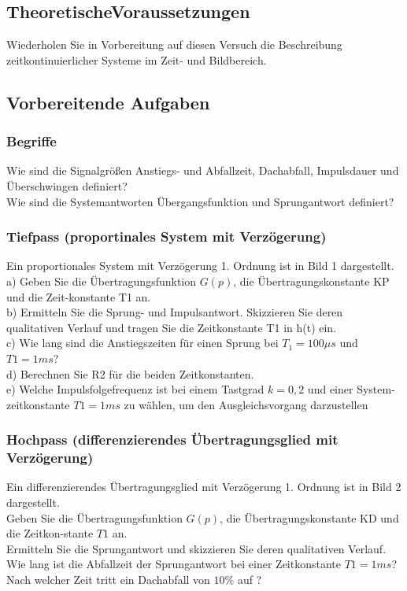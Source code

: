 \subsection{TheoretischeVoraussetzungen}

Wiederholen Sie in Vorbereitung auf diesen Versuch die Beschreibung 
zeitkontinuierlicher Systeme im Zeit- und Bildbereich.
\newline

\subsection{Vorbereitende Aufgaben}
\subsubsection{Begriffe}
Wie sind die Signalgrößen Anstiegs- und Abfallzeit, Dachabfall, Impulsdauer und Überschwingen definiert?\\
Wie sind die Systemantworten Übergangsfunktion und Sprungantwort definiert?\\
\subsubsection{Tiefpass (proportinales System mit Verzögerung)}
Ein proportionales System mit Verzögerung 1. Ordnung ist in Bild 1 dargestellt.\\
a)    Geben  Sie  die  Übertragungsfunktion  $G(p)$,  die  Übertragungskonstante  KP und die Zeit-konstante T1 an.\\ 
b)    Ermitteln  Sie  die  Sprung-  und  Impulsantwort. Skizzieren  Sie  deren  qualitativen  Verlauf und tragen Sie die Zeitkonstante T1 in h(t) ein.\\ 
c)    Wie lang sind die Anstiegszeiten für einen Sprung bei $T_{ 1 }=100\mu s$ und $T1 = 1 ms$?\\ 
d)    Berechnen Sie R2 für die beiden Zeitkonstanten.\\ 
e)    Welche Impulsfolgefrequenz ist bei einem Tastgrad $k = 0,2$ und einer System-zeitkonstante $T1 = 1 ms$ zu wählen, um den Ausgleichsvorgang darzustellen\\
\subsubsection{Hochpass (differenzierendes Übertragungsglied mit Verzögerung)}
Ein differenzierendes Übertragungsglied mit Verzögerung 1. Ordnung ist in Bild 2 dargestellt.\\
Geben  Sie  die  Übertragungsfunktion $G(p)$,  die  Übertragungskonstante  KD und die Zeitkon-stante $T1$ an.\\ 
Ermitteln Sie die Sprungantwort und skizzieren Sie deren qualitativen Verlauf.\\ 
Wie lang ist die Abfallzeit der Sprungantwort bei einer Zeitkonstante $T1 = 1 ms$?\\ 
Nach welcher Zeit tritt ein Dachabfall von $10\%$ auf ?\\
